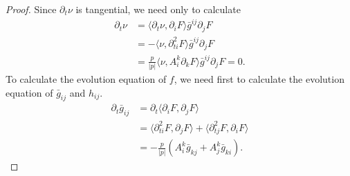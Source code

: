 \documentclass{amsart}
\theoremstyle{definition}
\theoremstyle{remark}
\numberwithin{equation}{section}
\begin{document}
\begin{proof}
Since $\partial_t \nu$ is tangential, we need only to calculate
\begin{align*}
\partial_t\nu&=\langle \partial_t\nu,\partial_iF\rangle \bar{g}^{ij}\partial_jF\\
&=-\langle \nu,\partial^2_{ti}F\rangle \bar{g}^{ij}\partial_jF\\
&=\frac{p}{|p|}\langle \nu, A _i^k\partial_kF\rangle \bar{g}^{ij}\partial_jF=0.
\end{align*}
To calculate the evolution equation of $ f $, we need first to calculate the evolution equation of $\bar{g}_{ij}$ and $h_{ij}.$
\begin{align*}
\partial_t \bar{g}_{ij}&=\partial_t \langle \partial_iF,\partial_jF\rangle\\
&=\langle \partial_{ti}^2F,\partial_jF\rangle+\langle \partial_{tj}^2F,\partial_iF\rangle\\
&=-\frac{p}{|p|}( A _{i}^k\bar{g}_{kj}+ A _{j}^k\bar{g}_{ki}).
\end{align*}




\end{proof}
\end{document}
